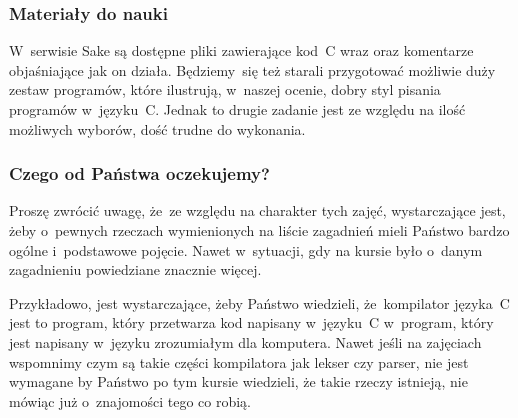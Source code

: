 \documentclass[10pt,t]{beamer}
\begin{document}
\begin{frame}
  \frametitle{Materiały do nauki}


  W~serwisie Sake są dostępne pliki zawierające kod~C wraz oraz komentarze
  objaśniające jak on działa. Będziemy~się też starali przygotować możliwie
  duży zestaw programów, które ilustrują, w~naszej ocenie, dobry styl
  pisania programów w~języku~C. Jednak to drugie zadanie jest ze względu
  na ilość możliwych wyborów, dość trudne do wykonania.

\end{frame}





\begin{frame}
  \frametitle{Czego od Państwa oczekujemy?}


  Proszę zwrócić uwagę, że~ze względu na charakter tych zajęć, wystarczające
  jest, żeby o~pewnych rzeczach wymienionych na liście zagadnień mieli
  Państwo bardzo ogólne i~podstawowe pojęcie. Nawet w~sytuacji, gdy na
  kursie było o~danym zagadnieniu powiedziane znacznie więcej.

  Przykładowo, jest wystarczające, żeby Państwo wiedzieli, że~kompilator
  języka~C jest to program, który przetwarza kod napisany w~języku~C
  w~program, który jest napisany w~języku zrozumiałym dla komputera.
  Nawet jeśli na zajęciach wspomnimy czym są takie części kompilatora
  jak lekser czy parser, nie jest wymagane by Państwo po tym kursie
  wiedzieli, że takie rzeczy istnieją, nie mówiąc już o~znajomości tego
  co robią.

\end{frame}
\end{document}
